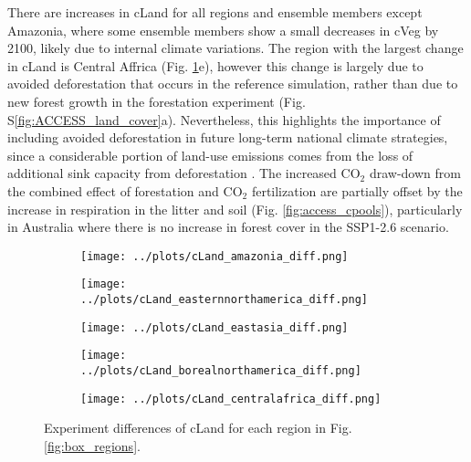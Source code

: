 \documentclass[]{article}
\begin{document}
There are increases in cLand for all regions and ensemble members except Amazonia, where some ensemble members show a small decreases in cVeg by 2100, likely due to internal climate variations.
The region with the largest change in cLand is Central Affrica (Fig. \ref{fig:accesss_regional_cland}e), however this change is largely due to avoided deforestation that occurs in the reference simulation, rather than due to new forest growth in the forestation experiment (Fig. S\ref{fig:ACCESS_land_cover}a).
Nevertheless, this highlights the importance of including avoided deforestation in future long-term national climate strategies, since a considerable portion of land-use emissions comes from the loss of additional sink capacity from deforestation \parencite{gitz_amplifying_2003, pongratz_terminology_2014, obermeier_modelled_2021}.
The increased CO$_2$ draw-down from the combined effect of forestation and CO$_2$ fertilization are partially offset by the increase in respiration in the litter and soil (Fig. \ref{fig:access_cpools}), particularly in Australia where there is no increase in forest cover in the SSP1-2.6 scenario.

\begin{figure}[H]
    \centering
    \begin{subfigure}[b]{0.4\linewidth}
        \texttt{[image: ../plots/cLand\_amazonia\_diff.png]}
    \end{subfigure}

    \begin{subfigure}[b]{0.4\linewidth}
        \texttt{[image: ../plots/cLand\_easternnorthamerica\_diff.png]}
    \end{subfigure}
    \begin{subfigure}[b]{0.4\linewidth}
        \texttt{[image: ../plots/cLand\_eastasia\_diff.png]}
    \end{subfigure}
    \begin{subfigure}[b]{0.4\linewidth}
        \texttt{[image: ../plots/cLand\_borealnorthamerica\_diff.png]}
    \end{subfigure}
    \begin{subfigure}[b]{0.4\linewidth}
        \texttt{[image: ../plots/cLand\_centralafrica\_diff.png]}
    \end{subfigure}
    \caption{Experiment differences of cLand for each region in Fig. \ref{fig:box_regions}.}
    \label{fig:accesss_regional_cland}
\end{figure}
\end{document}
